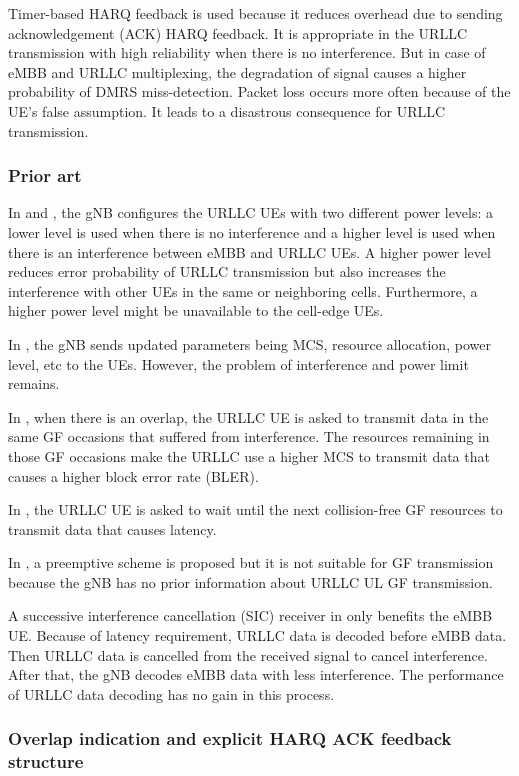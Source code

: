 \documentclass{ieeeaccess}
\begin{document}
Timer-based HARQ feedback is used because it reduces overhead due to sending acknowledgement (ACK) HARQ feedback. It is appropriate in the URLLC transmission with high reliability when there is no interference. But in case of eMBB and URLLC multiplexing, the degradation of signal causes a higher probability of DMRS miss-detection. Packet loss occurs more often because of the UE's false assumption. It leads to a disastrous consequence for URLLC transmission.

\subsubsection{Prior art} \label{IIBN}

In \cite{ref13} and \cite {ref14}, the gNB configures the URLLC UEs with two different power levels: a lower level is used when there is no interference and a higher level is used when there is an interference between eMBB and URLLC UEs. A higher power level reduces error probability of URLLC transmission but also increases the interference with other UEs in the same or neighboring cells. Furthermore, a higher power level might be unavailable to the cell-edge UEs.

In \cite{ref15}, the gNB sends updated parameters being MCS, resource allocation, power level, etc to the UEs. However, the problem of interference and power limit remains.

In \cite{ref16}, when there is an overlap, the URLLC UE is asked to transmit data in the same GF occasions that suffered from interference. The resources remaining in those GF occasions make the URLLC use a higher MCS to transmit data that causes a higher block error rate (BLER).

In \cite{ref17}, the URLLC UE is asked to wait until the next collision-free GF resources to transmit data that causes latency.

In \cite{ref18}, a preemptive scheme is proposed but it is not suitable for GF transmission because the gNB has no prior information about URLLC UL GF transmission.

A successive interference cancellation (SIC) receiver in \cite{ref19} only benefits the eMBB UE. Because of latency requirement, URLLC data is decoded before eMBB data. Then URLLC data is cancelled from the received signal to cancel interference. After that, the gNB decodes eMBB data with less interference. The performance of URLLC data decoding has no gain in this process.

\subsubsection{Overlap indication and explicit HARQ ACK feedback structure}\label{IIB2}
\end{document}
